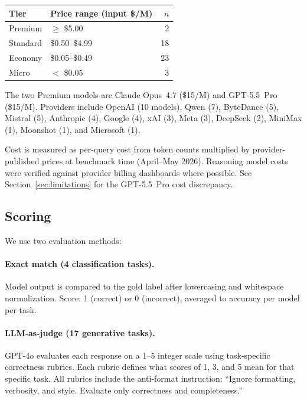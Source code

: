 \documentclass[11pt]{article}
\begin{document}
\begin{center}
\small
\begin{tabular}{llr}
\toprule
\textbf{Tier} & \textbf{Price range (input \$/M)} & \textbf{$n$} \\
\midrule
Premium  & $\geq$ \$5.00         & 2  \\
Standard & \$0.50--\$4.99        & 18 \\
Economy  & \$0.05--\$0.49        & 23 \\
Micro    & $<$ \$0.05            & 3  \\
\bottomrule
\end{tabular}
\end{center}

The two Premium models are Claude Opus~4.7 (\$15/M) and GPT-5.5~Pro
(\$15/M).  Providers include OpenAI (10 models), Qwen (7), ByteDance (5),
Mistral (5), Anthropic (4), Google (4), xAI (3), Meta (3), DeepSeek (2),
MiniMax (1), Moonshot (1), and Microsoft (1).

Cost is measured as per-query cost from token counts multiplied by
provider-published prices at benchmark time (April--May 2026).  Reasoning
model costs were verified against provider billing dashboards where
possible.  See Section~\ref{sec:limitations} for the GPT-5.5~Pro cost
discrepancy.

\subsection{Scoring}

We use two evaluation methods:

\paragraph{Exact match (4 classification tasks).}
Model output is compared to the gold label after lowercasing and
whitespace normalization.  Score: 1 (correct) or 0 (incorrect), averaged
to accuracy per model per task.

\paragraph{LLM-as-judge (17 generative tasks).}
GPT-4o evaluates each response on a 1--5 integer scale using
task-specific correctness rubrics.  Each rubric defines what scores of 1,
3, and 5 mean for that specific task.  All rubrics include the
anti-format instruction: ``Ignore formatting, verbosity, and style.
Evaluate only correctness and completeness.''
\end{document}
